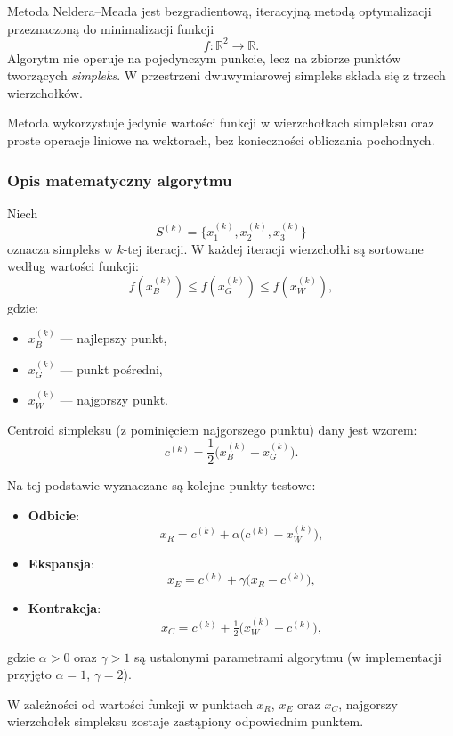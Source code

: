 \documentclass[10pt,a4paper]{article}
\begin{document}
Metoda Neldera--Meada jest bezgradientową, iteracyjną metodą optymalizacji
przeznaczoną do minimalizacji funkcji
\[
f:\mathbb{R}^2 \to \mathbb{R}.
\]
Algorytm nie operuje na pojedynczym punkcie, lecz na zbiorze punktów tworzących
\emph{simpleks}. W przestrzeni dwuwymiarowej simpleks składa się z trzech
wierzchołków.

Metoda wykorzystuje jedynie wartości funkcji w wierzchołkach simpleksu oraz
proste operacje liniowe na wektorach, bez konieczności obliczania pochodnych.



\subsubsection{Opis matematyczny algorytmu}

Niech
\[
S^{(k)} = \{x_1^{(k)}, x_2^{(k)}, x_3^{(k)}\}
\]
oznacza simpleks w $k$-tej iteracji. W każdej iteracji wierzchołki są sortowane
według wartości funkcji:
\[
f(x_B^{(k)}) \le f(x_G^{(k)}) \le f(x_W^{(k)}),
\]
gdzie:
\begin{itemize}
\item $x_B^{(k)}$ — najlepszy punkt,
\item $x_G^{(k)}$ — punkt pośredni,
\item $x_W^{(k)}$ — najgorszy punkt.
\end{itemize}

Centroid simpleksu (z pominięciem najgorszego punktu) dany jest wzorem:
\[
c^{(k)} = \frac{1}{2}\bigl(x_B^{(k)} + x_G^{(k)}\bigr).
\]

Na tej podstawie wyznaczane są kolejne punkty testowe:

\begin{itemize}
\item \textbf{Odbicie}:
\[
x_R = c^{(k)} + \alpha\bigl(c^{(k)} - x_W^{(k)}\bigr),
\]
\item \textbf{Ekspansja}:
\[
x_E = c^{(k)} + \gamma\bigl(x_R - c^{(k)}\bigr),
\]
\item \textbf{Kontrakcja}:
\[
x_C = c^{(k)} + \tfrac{1}{2}\bigl(x_W^{(k)} - c^{(k)}\bigr),
\]
\end{itemize}

gdzie $\alpha>0$ oraz $\gamma>1$ są ustalonymi parametrami algorytmu
(w implementacji przyjęto $\alpha=1$, $\gamma=2$).

W zależności od wartości funkcji w punktach $x_R$, $x_E$ oraz $x_C$,
najgorszy wierzchołek simpleksu zostaje zastąpiony odpowiednim punktem.
\end{document}
